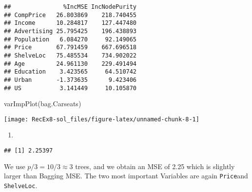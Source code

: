 \documentclass[
]{article}
\newenvironment{Shaded}{\begin{snugshade}}{\end{snugshade}}
\newcommand{\AttributeTok}[1]{\textcolor[rgb]{0.77,0.63,0.00}{#1}}
\newcommand{\ConstantTok}[1]{\textcolor[rgb]{0.00,0.00,0.00}{#1}}
\newcommand{\DecValTok}[1]{\textcolor[rgb]{0.00,0.00,0.81}{#1}}
\newcommand{\FunctionTok}[1]{\textcolor[rgb]{0.00,0.00,0.00}{#1}}
\newcommand{\NormalTok}[1]{#1}
\newcommand{\OtherTok}[1]{\textcolor[rgb]{0.56,0.35,0.01}{#1}}
\newcommand{\SpecialCharTok}[1]{\textcolor[rgb]{0.00,0.00,0.00}{#1}}
\providecommand{\tightlist}{%
  \setlength{\itemsep}{0pt}\setlength{\parskip}{0pt}}
\begin{document}
\begin{verbatim}
##               %IncMSE IncNodePurity
## CompPrice   26.803869    218.740455
## Income      10.284817    127.447480
## Advertising 25.795425    196.438893
## Population   6.084270     92.149065
## Price       67.791459    667.696518
## ShelveLoc   75.485534    734.902022
## Age         24.961130    229.491494
## Education    3.423565     64.510742
## Urban       -1.373635      9.423406
## US           3.141449     10.105870
\end{verbatim}

\begin{Shaded}
\begin{Highlighting}[]
\FunctionTok{varImpPlot}\NormalTok{(bag.Carseats)}
\end{Highlighting}
\end{Shaded}

\texttt{[image: RecEx8-sol\_files/figure-latex/unnamed-chunk-8-1]}

\begin{enumerate}
\def\labelenumi{\alph{enumi})}
\setcounter{enumi}{4}
\tightlist
\item
\end{enumerate}

\begin{Shaded}
\end{Shaded}

\begin{verbatim}
## [1] 2.25397
\end{verbatim}

We use \(p/3 = 10/3 \approx 3\) trees, and we obtain an MSE of 2.25
which is slightly larger than Bagging MSE. The two most important
Variables are again \texttt{Price}and \texttt{ShelveLoc}.
\end{document}
